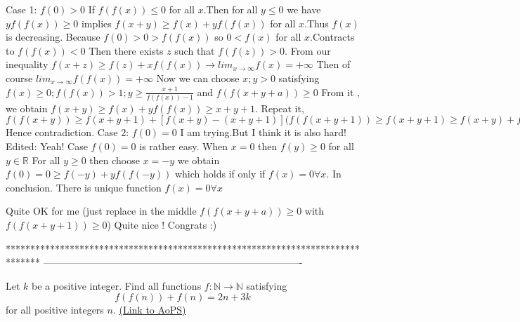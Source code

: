 \begin{solution}
	\begin{tcolorbox}Case 1: $ f(0) > 0$
If $ f(f(x)) \le 0$ for all $ x$.Then for all $ y\le 0$ we have $ yf(f(x))\ge 0$ implies $ f(x + y)\ge f(x) + yf(f(x))$ for all $ x$.Thus $ f(x)$ is decreasing.
Because $ f(0) > 0 > f(f(x))$ so $ 0 < f(x)$ for all $ x$.Contracts to  $ f(f(x)) < 0$
Then there exists $ z$ such that $ f(f(z)) > 0$.
From our inequality $ f(x + z)\ge f(z) + xf(f(x))\rightarrow lim_{x\to \infty} f(x) = + \infty$
Then of course $ lim_{x\to \infty}f(f(x)) = + \infty$
Now we can choose $ x; y > 0$ satisfying $ f(x)\ge 0; f(f(x)) > 1; y\ge \frac {x + 1}{f(f(x)) - 1}$ and $ f(f(x + y + a)) \ge 0$
From it , we obtain $ f(x + y)\ge f(x) + yf(f(x))\ge x + y + 1$.
Repeat it, 
$ f(f(x + y))\ge f(x + y + 1) + [f(x + y) - (x + y + 1)](f(f(x + y + 1)) \ge f(x + y + 1)\ge f(x + y) + f(f(x + y))\ge f(x) + y(ff(x)) + f(f(x + y)) > f(f(x + y))$
Hence contradiction.
Case 2: $ f(0) = 0$
I am trying.But I think it is also hard!
Edited: 
Yeah! Case $ f(0) = 0$ is rather easy.
When $ x = 0$ then $ f(y)\ge 0$ for all $ y\in \mathbb R$
For all $ y\ge 0$ then choose $ x = - y$ we obtain $ f(0) = 0\ge f( - y) + yf(f( - y))$ which holds if only if $ f(x) = 0 \forall x$.
In conclusion. There is unique function $ f(x) = 0\forall x$\end{tcolorbox}

Quite OK for me (just replace in the middle $ f(f(x + y + a)) \ge 0$ with $ f(f(x + y + 1)) \ge 0$)
Quite nice !
Congrats  :)
\end{solution}
*******************************************************************************
-------------------------------------------------------------------------------

\begin{problem}
	Let $ k$ be a positive integer. Find all functions $ f: \mathbb  N \to \mathbb N$ satisfying 
\[f(f(n))+f(n)=2n+3k\] for all positive integers $n$.
	\flushright \href{https://artofproblemsolving.com/community/c6h308067}{(Link to AoPS)}
\end{problem}



